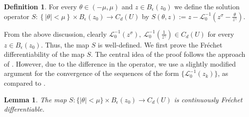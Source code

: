 \documentclass[reqno,oneside]{amsart}
\newtheorem{lemma}[theorem]{Lemma}
\theoremstyle{definition}
\newtheorem{definition}[theorem]{Definition}
\theoremstyle{remark}
\numberwithin{equation}{section}
\newcommand{\rar}{\rightarrow}
\newcommand{\si}{\sigma}
\newcommand{\ball}{B_{\epsilon} (z_0)}
\newcommand{\li}{\mathcal{L}_0^{-1}}
\begin{document}
\begin{definition}\label{definition_of_S}
For every $\theta\in (-\mu,\mu)$ and $z\in B_\epsilon(z_0)$  we  define the solution operator $S : \left\{|\theta| < \mu \right\} \times B_{\epsilon} (z_0) \rar C_d (U) $ by $\displaystyle{S(\theta, z):= z - \mathcal{L}_0^{-1} \left(z^{\si} - \frac{\theta}{z^{\gamma}} \right)}$.
\end{definition}
From the above discussion, clearly $\li \left(z^{\si}\right),\ \li \left( \frac{1}{z^{\gamma}} \right) \in C_d (U)$ for every $z\in \ball$. Thus, the map $S$ is well-defined. We first prove the Fr\'echet differentiability of the map $S$. The central idea of the proof follows the approach of \cite{giacomoni2019existence}. However, due to the difference in the operator, we use a slightly modified argument for the convergence of the sequences of the form $\{\li (z_k)\}$, as compared to \cite{giacomoni2019existence}.

\begin{lemma}\label{G cont diff}
    The map $S: \{|\theta| < \mu \} \times B_{\epsilon} (z_0) \rar C_d (U)$ is continuously Fr\'echet differentiable.
\end{lemma}
\end{document}
